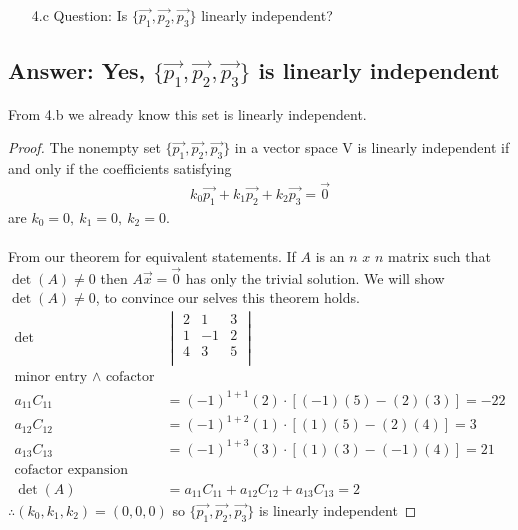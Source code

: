 \documentclass[12pt]{article}
\begin{document}
\pagebreak
\begin{enumerate}
        \item[4.c]Question: Is $\{\vec{p_1},\vec{p_2},\vec{p_3}\}$ linearly independent?
\end{enumerate}
\subsection{Answer: Yes, $\{\vec{p_1},\vec{p_2},\vec{p_3}\}$ is linearly independent}
From 4.b we already know this set is linearly independent.
\begin{proof}
        The nonempty set $\{\vec{p_{1}},\vec{p_{2}},\vec{p_{3}}\}$
        in a vector space V is linearly independent if and only if the
        coefficients satisfying
        \begin{align*}
                k_{0}\vec{p_{1}} + k_{1}\vec{p_{2}} + k_{2}\vec{p_{3}} = \vec{0}
        \end{align*}
        are $k_{0} = 0,\ k_{1} = 0,\ k_{2} = 0$. \\\\
        From our theorem for equivalent statements.
        If $A$ is an $n$ $x$ $n$ matrix such that $\det(A)\neq0$
        then $A\vec{x}=\vec{0}$ has only the trivial solution.
        We will show $\det(A)\neq0$, to convince our selves this theorem holds.
        \begin{align*}
                \det
                             &
                \begin{vmatrix}
                        2 & 1  & 3 \\
                        1 & -1 & 2 \\
                        4 & 3  & 5 \\
                \end{vmatrix}
                \\
                \textrm{minor entry $\land$ cofactor}                           \\
                a_{11}C_{11} & = (-1)^{1+1}(2)\cdot[(-1)(5)-(2)(3)] = -22       \\
                a_{12}C_{12} & = (-1)^{1+2}(1)\cdot[(1)(5)-(2)(4)]  = 3         \\
                a_{13}C_{13} & = (-1)^{1+3}(3)\cdot[(1)(3)-(-1)(4)] = 21        \\
                \textrm{cofactor expansion }                                    \\
                \det(A)      & = a_{11}C_{11} + a_{12}C_{12} + a_{13}C_{13} = 2
        \end{align*}
        $\therefore (k_{0}, k_{1}, k_{2}) = (0,0,0)$ so $\{\vec{p_{1}}, \vec{p_{2}}, \vec{p_{3}}\}$ is linearly independent
\end{proof}
\pagebreak
\end{document}
